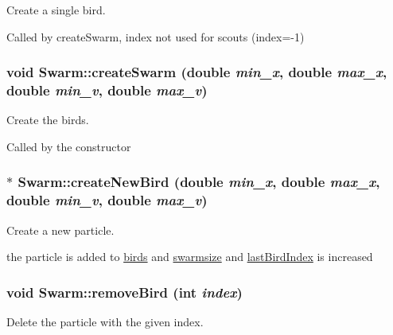 Create a single bird. 

Called by createSwarm, index not used for scouts (index=-1) \hypertarget{classSwarm_1ba247983a6f20d0e835c696748a530b}{
\subsubsection{\setlength{\rightskip}{0pt plus 5cm}void Swarm::createSwarm (double {\em min\_\-x}, \/  double {\em max\_\-x}, \/  double {\em min\_\-v}, \/  double {\em max\_\-v})}}
\label{classSwarm_1ba247983a6f20d0e835c696748a530b}


Create the birds. 

Called by the constructor \hypertarget{classSwarm_5371bfef5da1070085c0f98498d01783}{
\subsubsection{ $\ast$ Swarm::createNewBird (double {\em min\_\-x}, \/  double {\em max\_\-x}, \/  double {\em min\_\-v}, \/  double {\em max\_\-v})}}
\label{classSwarm_5371bfef5da1070085c0f98498d01783}


Create a new particle. 

the particle is added to \hyperlink{classSwarm_74191c7a473df093f5537f8d6d5ca1a6}{birds} and \hyperlink{classSwarm_0ed97963cfeb4f2b8eee5c4fb6f6dcde}{swarmsize} and \hyperlink{classSwarm_9e9e482ef70387a81721eb5e2b998725}{lastBirdIndex} is increased \hypertarget{classSwarm_c4550c4e3a04350e6b3d1481b896ee8a}{
\subsubsection{\setlength{\rightskip}{0pt plus 5cm}void Swarm::removeBird (int {\em index})}}
\label{classSwarm_c4550c4e3a04350e6b3d1481b896ee8a}


Delete the particle with the given index. 

